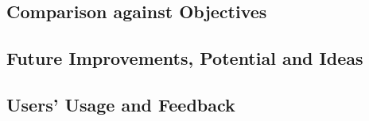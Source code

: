 \documentclass{article}
\begin{document}
  \subsection{Comparison against Objectives}
  \subsection{Future Improvements, Potential and Ideas}
  \subsection{Users' Usage and Feedback }


  \clearpage
  \let\Section\section
  \def\section*#1{\Section{#1}}

  \printbibliography
\end{document}
